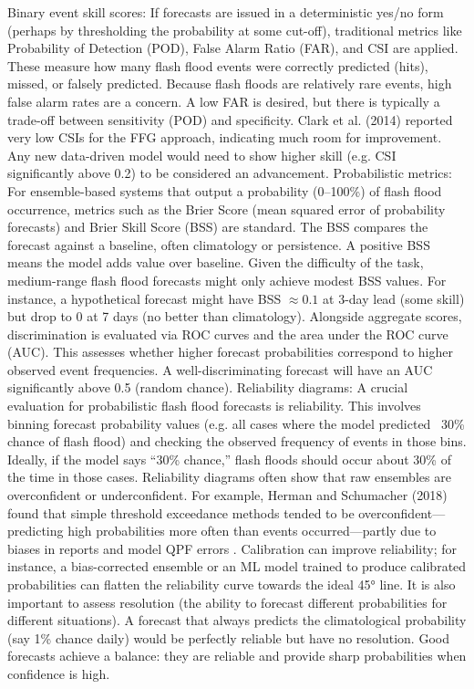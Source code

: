 Binary event skill scores: If forecasts are issued in a deterministic yes/no form (perhaps by thresholding the probability at some cut-off), traditional metrics like Probability of Detection (POD), False Alarm Ratio (FAR), and CSI are applied. These measure how many flash flood events were correctly predicted (hits), missed, or falsely predicted. Because flash floods are relatively rare events, high false alarm rates are a concern. A low FAR is desired, but there is typically a trade-off between sensitivity (POD) and specificity. Clark et al. (2014) reported very low CSIs for the FFG approach, indicating much room for improvement. Any new data-driven model would need to show higher skill (e.g. CSI significantly above 0.2) to be considered an advancement.
Probabilistic metrics: For ensemble-based systems that output a probability (0–100\%) of flash flood occurrence, metrics such as the Brier Score (mean squared error of probability forecasts) and Brier Skill Score (BSS) are standard. The BSS compares the forecast against a baseline, often climatology or persistence. A positive BSS means the model adds value over baseline. Given the difficulty of the task, medium-range flash flood forecasts might only achieve modest BSS values. For instance, a hypothetical forecast might have BSS $\approx 0.1$ at 3-day lead (some skill) but drop to 0 at 7 days (no better than climatology). Alongside aggregate scores, discrimination is evaluated via ROC curves and the area under the ROC curve (AUC). This assesses whether higher forecast probabilities correspond to higher observed event frequencies. A well-discriminating forecast will have an AUC significantly above 0.5 (random chance).
Reliability diagrams: A crucial evaluation for probabilistic flash flood forecasts is reliability. This involves binning forecast probability values (e.g. all cases where the model predicted ~30\% chance of flash flood) and checking the observed frequency of events in those bins. Ideally, if the model says “30\% chance,” flash floods should occur about 30\% of the time in those cases. Reliability diagrams often show that raw ensembles are overconfident or underconfident. For example, Herman and Schumacher (2018) found that simple threshold exceedance methods tended to be overconfident—predicting high probabilities more often than events occurred—partly due to biases in reports and model QPF errors \citep{Herman2018}. Calibration can improve reliability; for instance, a bias-corrected ensemble or an ML model trained to produce calibrated probabilities can flatten the reliability curve towards the ideal 45° line. It is also important to assess resolution (the ability to forecast different probabilities for different situations). A forecast that always predicts the climatological probability (say 1\% chance daily) would be perfectly reliable but have no resolution. Good forecasts achieve a balance: they are reliable and provide sharp probabilities when confidence is high.
